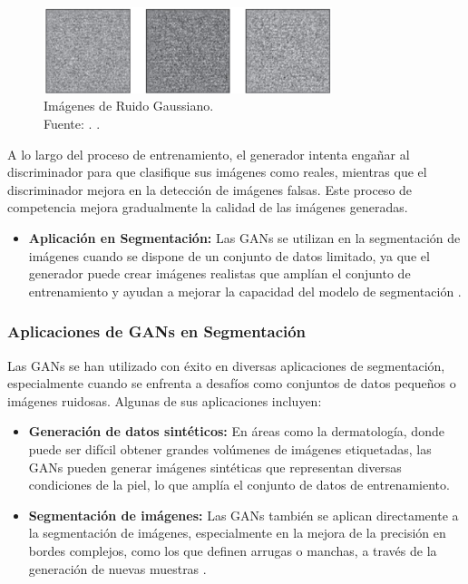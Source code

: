 \begin{figure}[!ht]
	\begin{center}
		\includegraphics[width=0.75\textwidth]{2/figures/redgan3.jpg}
		\caption[Imágenes de Ruido Gaussiano]{Imágenes de Ruido Gaussiano.\\
		Fuente: \cite{tec_goodfellow2014gan}. .}
		\label{2:fig49}
	\end{center}
\end{figure}
A lo largo del proceso de entrenamiento, el generador intenta engañar al discriminador para que clasifique sus imágenes como reales, mientras que el discriminador mejora en la detección de imágenes falsas. Este proceso de competencia mejora gradualmente la calidad de las imágenes generadas.  
\begin{itemize}
    \item \textbf{Aplicación en Segmentación:} Las GANs se utilizan en la segmentación de imágenes cuando se dispone de un conjunto de datos limitado, ya que el generador puede crear imágenes realistas que amplían el conjunto de entrenamiento y ayudan a mejorar la capacidad del modelo de segmentación \parencite{autor2020gans}.
\end{itemize}

\subsubsection{Aplicaciones de GANs en Segmentación}  
Las GANs se han utilizado con éxito en diversas aplicaciones de segmentación, especialmente cuando se enfrenta a desafíos como conjuntos de datos pequeños o imágenes ruidosas. Algunas de sus aplicaciones incluyen:
\begin{itemize}
    \item \textbf{Generación de datos sintéticos:} En áreas como la dermatología, donde puede ser difícil obtener grandes volúmenes de imágenes etiquetadas, las GANs pueden generar imágenes sintéticas que representan diversas condiciones de la piel, lo que amplía el conjunto de datos de entrenamiento.
    \item \textbf{Segmentación de imágenes:} Las GANs también se aplican directamente a la segmentación de imágenes, especialmente en la mejora de la precisión en bordes complejos, como los que definen arrugas o manchas, a través de la generación de nuevas muestras \parencite{autor2021gans_segmentacion}.
\end{itemize}

